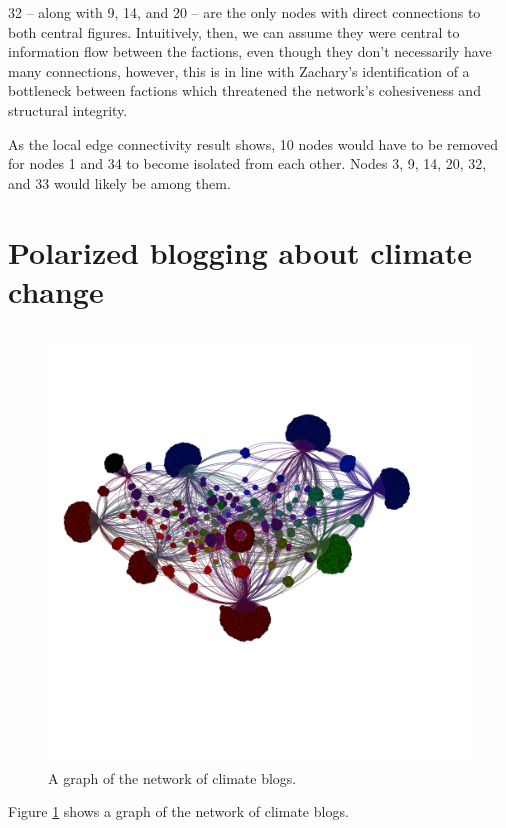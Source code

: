 \documentclass[11pt]{article}
\begin{document}
32 -- along with 9, 14, and 20 -- are the only nodes with direct connections to both
central figures. Intuitively, then, we can assume they were central to information flow
between the factions, even though they don't necessarily have many connections, however,
this is in line with Zachary's identification of a bottleneck between factions which
threatened the network's cohesiveness and structural integrity.

As the local edge connectivity result shows, 10 nodes would have to be removed for
nodes 1 and 34 to become isolated from each other. Nodes 3, 9, 14, 20, 32, and 33 would
likely be among them.

\section{Polarized blogging about climate change}
\subsection{}
\begin{figure}
  \includegraphics[width=\linewidth]{Figure_3.png}
  \caption{A graph of the network of climate blogs.}
  \label{fig:graph}
\end{figure}

Figure \ref{fig:graph} shows a graph of the network of climate blogs.
\end{document}
